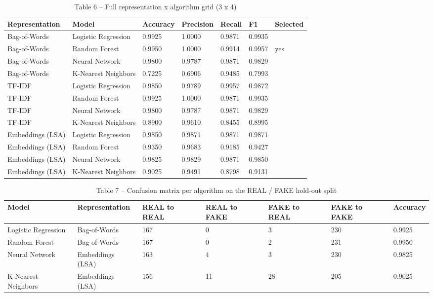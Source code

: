 \documentclass[conference,a4paper]{IEEEtran}
\begin{document}
\begin{table}[!t]
  \centering
  \footnotesize
  \caption{Table 6 -- Full representation x algorithm grid (3 x 4)}
  \label{tab:table6fullrepresentationxalg}
  \begin{tabular}{lllllll}
    \toprule
    Representation & Model & Accuracy & Precision & Recall & F1 & Selected \\
    \midrule
    Bag-of-Words & Logistic Regression & 0.9925 & 1.0000 & 0.9871 & 0.9935 &  \\
    Bag-of-Words & Random Forest & 0.9950 & 1.0000 & 0.9914 & 0.9957 & yes \\
    Bag-of-Words & Neural Network & 0.9800 & 0.9787 & 0.9871 & 0.9829 &  \\
    Bag-of-Words & K-Nearest Neighbors & 0.7225 & 0.6906 & 0.9485 & 0.7993 &  \\
    TF-IDF & Logistic Regression & 0.9850 & 0.9789 & 0.9957 & 0.9872 &  \\
    TF-IDF & Random Forest & 0.9925 & 1.0000 & 0.9871 & 0.9935 &  \\
    TF-IDF & Neural Network & 0.9800 & 0.9787 & 0.9871 & 0.9829 &  \\
    TF-IDF & K-Nearest Neighbors & 0.8900 & 0.9610 & 0.8455 & 0.8995 &  \\
    Embeddings (LSA) & Logistic Regression & 0.9850 & 0.9871 & 0.9871 & 0.9871 &  \\
    Embeddings (LSA) & Random Forest & 0.9350 & 0.9683 & 0.9185 & 0.9427 &  \\
    Embeddings (LSA) & Neural Network & 0.9825 & 0.9829 & 0.9871 & 0.9850 &  \\
    Embeddings (LSA) & K-Nearest Neighbors & 0.9025 & 0.9491 & 0.8798 & 0.9131 &  \\
    \bottomrule
  \end{tabular}
\end{table}

\begin{table}[!t]
  \centering
  \footnotesize
  \caption{Table 7 -- Confusion matrix per algorithm on the REAL / FAKE hold-out split}
  \label{tab:table7confusionmatrixperalgo}
  \begin{tabular}{lllllll}
    \toprule
    Model & Representation & REAL to REAL & REAL to FAKE & FAKE to REAL & FAKE to FAKE & Accuracy \\
    \midrule
    Logistic Regression & Bag-of-Words & 167 & 0 & 3 & 230 & 0.9925 \\
    Random Forest & Bag-of-Words & 167 & 0 & 2 & 231 & 0.9950 \\
    Neural Network & Embeddings (LSA) & 163 & 4 & 3 & 230 & 0.9825 \\
    K-Nearest Neighbors & Embeddings (LSA) & 156 & 11 & 28 & 205 & 0.9025 \\
    \bottomrule
  \end{tabular}
\end{table}
\end{document}
